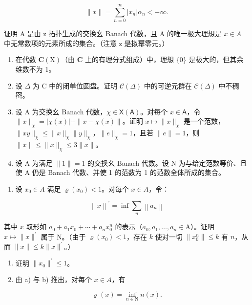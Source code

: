 \[
\| x \| = \sum_ {n = 0} ^ {\infty} | x _ {n} | \alpha_ {n} <   + \infty .
\]

  证明 A 是由 z 拓扑生成的交换幺 Banach 代数，且 A 的唯一极大理想是 \(x \in A\) 中无常数项的元素所成的集合。（注意 z 是拟幂零元。）

\begin{enumerate}
\def\labelenumi{\arabic{enumi})}
\setcounter{enumi}{4}
\item
  在代数 \(\mathbf{C}(\mathrm{X})\)（由 \(\mathbf{C}\) 上的有理分式组成）中，理想 \(\{0\}\) 是极大的，但其余维数不为 1。
\item
  设 \(\Delta\) 为 C 中的闭单位圆盘。证明 \(\mathcal{C}(\Delta)\) 中的可逆元群在 \(\mathcal{C}(\Delta)\) 中不稠密。
\item
  设 A 为交换幺 Banach 代数，\(\chi \in \mathsf{X}(\mathsf{A})\)。对每个 \(x \in \mathsf{A}\)，令 \(\|x\|_{\chi} = |\chi(x)| + \|x - \chi(x)\|\)。证明 \(x \mapsto \|x\|_{\chi}\) 是一个范数，\(\|xy\|_{\chi} \leqslant \|x\|_{\chi}\|y\|_{\chi}\)，\(\|e\|_{\chi} = 1\)，且若 \(\|e\| = 1\)，则 \(\|x\| \leqslant \|x\|_{\chi} \leqslant 3\|x\|\)。
\item
  设 A 为满足 \(\|1\| = 1\) 的交换幺 Banach 代数。设 N 为与给定范数等价、且使 A 仍是 Banach 代数、并使 1 的范数为 1 的范数全体所成的集合。
\end{enumerate}

\begin{enumerate}
\def\labelenumi{\alph{enumi})}
\tightlist
\item
  设 \(x_{0} \in A\) 满足 \(\varrho(x_{0}) < 1\)。对每个 \(x \in A\)，令：
\end{enumerate}

\[
\left\| x \right\| ^ {\prime} = \inf \sum_ {n} \left\| a _ {n} \right\|
\]

其中 \(x\) 取形如 \(a_0 + a_1 x_0 + \cdots + a_n x_0^n\) 的表示（\(a_0, a_1, \ldots, a_n \in \mathrm{A}\)）。证明 \(x \mapsto \|x\|^{\prime}\) 属于 N。（由于 \(\varrho(x_0) < 1\)，存在 \(k\) 使对一切 \(\|x_0^n\| \leqslant k\) 有 \(n\)，从而 \(\|x\| \leqslant k \|x\|^{\prime}\)。）

\begin{enumerate}
\def\labelenumi{\alph{enumi})}
\setcounter{enumi}{1}
\item
  证明 \(\|x_{0}\|^{\prime}\leqslant1\)。
\item
  由 a) 与 b) 推出，对每个 \(x \in A\)，有
\end{enumerate}

\[
\varrho (x) = \inf _ {n \in \mathrm{N}} n (x).
\]

